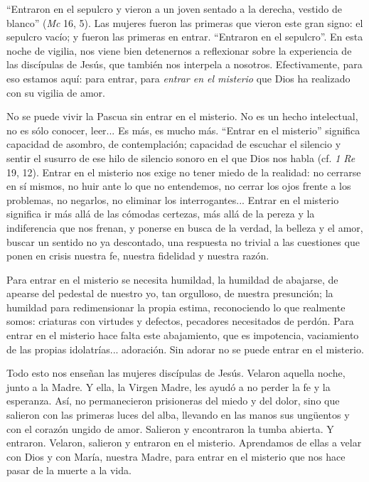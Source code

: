 			\begin{body}“Entraron en el sepulcro y vieron a un joven sentado a la derecha, vestido de blanco” (\textit{Mc} 16, 5). Las mujeres fueron las primeras que vieron este gran signo: el sepulcro vacío; y fueron las primeras en entrar. “Entraron en el sepulcro”. En esta noche de vigilia, nos viene bien detenernos a reflexionar sobre la experiencia de las discípulas de Jesús, que también nos interpela a nosotros. Efectivamente, para eso estamos aquí: para entrar, para \textit{entrar en el misterio }que Dios ha realizado con su vigilia de amor.\end{body}
			
			\begin{body}No se puede vivir la Pascua sin entrar en el misterio. No es un hecho intelectual, no es sólo conocer, leer... Es más, es mucho más. “Entrar en el misterio” significa capacidad de asombro, de contemplación; capacidad de escuchar el silencio y sentir el susurro de ese hilo de silencio sonoro en el que Dios nos habla (cf. \textit{1 Re} 19, 12). Entrar en el misterio nos exige no tener miedo de la realidad: no cerrarse en sí mismos, no huir ante lo que no entendemos, no cerrar los ojos frente a los problemas, no negarlos, no eliminar los interrogantes... Entrar en el misterio significa ir más allá de las cómodas certezas, más allá de la pereza y la indiferencia que nos frenan, y ponerse en busca de la verdad, la belleza y el amor, buscar un sentido no ya descontado, una respuesta no trivial a las cuestiones que ponen en crisis nuestra fe, nuestra fidelidad y nuestra razón.\end{body}
			
			\begin{body}Para entrar en el misterio se necesita humildad, la humildad de abajarse, de apearse del pedestal de nuestro yo, tan orgulloso, de nuestra presunción; la humildad para redimensionar la propia estima, reconociendo lo que realmente somos: criaturas con virtudes y defectos, pecadores necesitados de perdón. Para entrar en el misterio hace falta este abajamiento, que es impotencia, vaciamiento de las propias idolatrías... adoración. Sin adorar no se puede entrar en el misterio.\end{body}
			
			\begin{body}Todo esto nos enseñan las mujeres discípulas de Jesús. Velaron aquella noche, junto a la Madre. Y ella, la Virgen Madre, les ayudó a no perder la fe y la esperanza. Así, no permanecieron prisioneras del miedo y del dolor, sino que salieron con las primeras luces del alba, llevando en las manos sus ungüentos y con el corazón ungido de amor. Salieron y encontraron la tumba abierta. Y entraron. Velaron, salieron y entraron en el misterio. Aprendamos de ellas a velar con Dios y con María, nuestra Madre, para entrar en el misterio que nos hace pasar de la muerte a la vida.\end{body}
			
